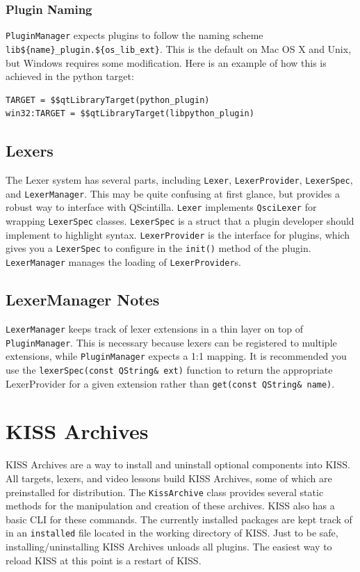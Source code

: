 \documentclass[7pt,letterpaper]{article}
\newcommand{\code}[1]{\texttt{#1}}
\begin{document}
	\subsubsection{Plugin Naming}
	\code{PluginManager} expects plugins to follow the naming scheme \code{lib\$\{name\}\_plugin.\$\{os\_lib\_ext\}}. This is the default on Mac OS X and Unix, but Windows
	requires some modification. Here is an example of how this is achieved in the python target:
	
	\begin{lstlisting}
TARGET = $$qtLibraryTarget(python_plugin)
win32:TARGET = $$qtLibraryTarget(libpython_plugin)
	\end{lstlisting}
	\vspace{.25in}
	
	\subsection{Lexers}
	The Lexer system has several parts, including \code{Lexer}, \code{LexerProvider}, \code{LexerSpec}, and \code{LexerManager}. This may be quite confusing at first glance,
	but provides a robust way to interface with QScintilla. \code{Lexer} implements \code{QsciLexer} for wrapping \code{LexerSpec} classes. 
	\code{LexerSpec} is a struct that a plugin developer should implement to highlight syntax. \code{LexerProvider} is the interface for plugins, which
	gives you a \code{LexerSpec} to configure in the \code{init()} method of the plugin. \code{LexerManager} manages the loading of \code{LexerProvider}s.
	
	\subsection{LexerManager Notes}
	\code{LexerManager} keeps track of lexer extensions in a thin layer on top of \code{PluginManager}. This is necessary because lexers can be registered to
	multiple extensions, while \code{PluginManager} expects a 1:1 mapping. It is recommended you use the \code{lexerSpec(const QString\& ext)} function to return the
	appropriate LexerProvider for a given extension rather than \code{get(const QString\& name)}.

	\section{KISS Archives}
	KISS Archives are a way to install and uninstall optional components into KISS. All targets, lexers, and video lessons build KISS Archives, some of which are
	preinstalled for distribution. The \code{KissArchive} class provides several static methods for the manipulation and creation of these archives. KISS also has a
	basic CLI for these commands. The currently installed packages are kept track of in an \code{installed} file located in the working directory of KISS.
	Just to be safe, installing/uninstalling KISS Archives unloads all plugins. The easiest way to reload KISS at this point is a restart of KISS.
	
\end{document}

